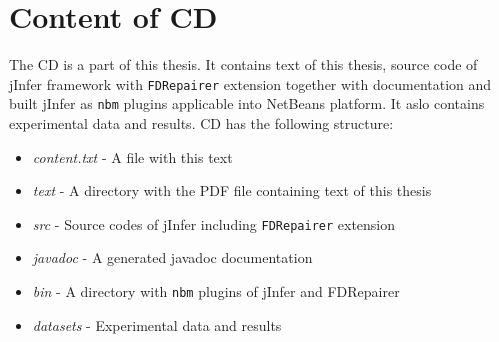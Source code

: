 \chapter{Content of CD}

The CD is a part of this thesis. It contains text of this thesis, source code of jInfer framework with \texttt{FDRepairer} extension together with documentation and built jInfer as \texttt{nbm} plugins applicable into NetBeans platform. It aslo contains experimental data and results. CD has the following structure:

\begin{itemize}
	\item \textit{content.txt} - A file with this text
    \item \textit{text} - A directory with the PDF file containing text of this thesis
    \item \textit{src} - Source codes of jInfer including \texttt{FDRepairer} extension
    \item \textit{javadoc} - A generated javadoc documentation
    \item \textit{bin} - A directory with \texttt{nbm} plugins of jInfer and FDRepairer
    \item \textit{datasets} - Experimental data and results
\end{itemize}
